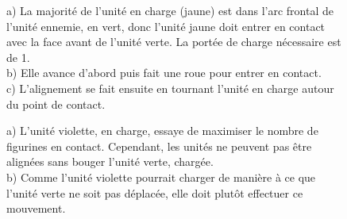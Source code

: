 \begin{figure}[!htbp]
\centering
\def\svgwidth{\columnwidth}

\caption{a) La majorité de l'unité en charge (jaune) est dans l'arc frontal de l'unité ennemie, en vert, donc l'unité jaune doit entrer en contact avec la face avant de l'unité verte. La portée de charge nécessaire est de \unit{1}{\pouce}. \\
b) Elle avance d'abord puis fait une roue pour entrer en contact. \\
c) L'alignement se fait ensuite en tournant l'unité en charge autour du point de contact.}
\label{figure/charge}
\end{figure}

\begin{figure}[!htbp]
\centering
\def\svgwidth{\columnwidth}

\caption{a) L'unité violette, en charge, essaye de maximiser le nombre de figurines en contact. Cependant, les unités ne peuvent pas être alignées sans bouger l'unité verte, chargée. \\
b) Comme l'unité violette pourrait charger de manière à ce que l'unité verte ne soit pas déplacée, elle doit plutôt effectuer ce mouvement.}
\label{figure/charge_alignement}
\end{figure}

